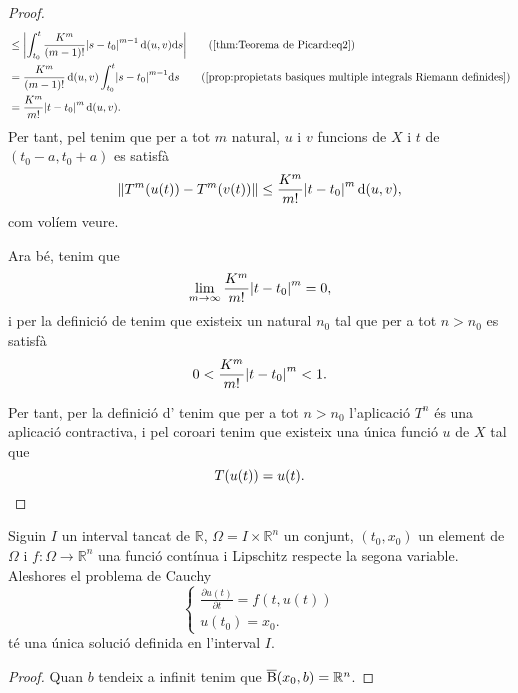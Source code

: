 \documentclass[../Apunts.tex]{subfiles}
\begin{document}
\begin{theorem}
\begin{proof}
\begin{align*}
				&\leq\abs{\int_{t_{0}}^{t}\frac{K^{m}}{(m-1)!}\abs{s-t_{0}}^{m-1}\distancia(u,v)\diff s}\tag{\ref{thm:Teorema de Picard:eq2}}\\
				&=\frac{K^{m}}{(m-1)!}\distancia(u,v)\int_{t_{0}}^{t}\abs{s-t_{0}}^{m-1}\diff s\tag{\ref{prop:propietats basiques multiple integrals Riemann definides}}\\
				&=\frac{K^{m}}{m!}\abs{t-t_{0}}^{m}\distancia(u,v).%
			\end{align*}
			Per tant, pel  tenim que per a tot \(m\) natural, \(u\) i \(v\) funcions de \(X\) i \(t\) de \((t_{0}-a,t_{0}+a)\) es satisfà
			\[\norm{T^{m}(u(t))-T^{m}(v(t))}\leq\frac{K^{m}}{m!}\abs{t-t_{0}}^{m}\distancia(u,v),\]
			com volíem veure.
			
			Ara bé, tenim que
			\[\lim_{m\to\infty}\frac{K^{m}}{m!}\abs{t-t_{0}}^{m}=0,\]%
			i per la definició de  tenim que existeix un natural \(n_{0}\) tal que per a tot \(n>n_{0}\) es satisfà
			\[0<{\frac{K^{m}}{m!}\abs{t-t_{0}}^{m}}<1.\]
			
			Per tant, per la definició d' tenim que per a tot \(n>n_{0}\) l'aplicació \(T^{n}\) és una aplicació contractiva, i pel coro{\lgem}ari  tenim que existeix una única funció \(u\) de \(X\) tal que
			\[T(u(t))=u(t).\qedhere\]
		\end{proof}
	\end{theorem}
	\begin{corollary}
		\label{cor:Teorema de Picard}
		Siguin \(I\) un interval tancat de \(\mathbb{R}\), \(\Omega=I\times\mathbb{R}^{n}\) un conjunt, \((t_{0},x_{0})\) un element de \(\Omega\) i \(f\colon\Omega\longrightarrow\mathbb{R}^{n}\) una funció contínua i Lipschitz respecte la segona variable. Aleshores el problema de Cauchy
		\[\begin{cases*}
			\displaystyle \frac{\partial u(t)}{\partial t}=f(t,u(t)) \\
			\displaystyle u(t_{0})=x_{0}.
		\end{cases*}\]
		té una única solució definida en l'interval \(I\).
		\begin{proof}
			Quan \(b\) tendeix a infinit tenim que \(\overline{\operatorname{B}}(x_{0},b)=\mathbb{R}^{n}\).
		\end{proof}
	\end{corollary}
\end{document}
